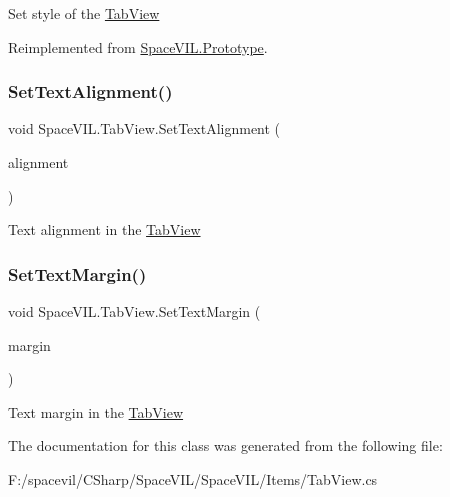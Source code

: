 Set style of the \mbox{\hyperlink{class_space_v_i_l_1_1_tab_view}{Tab\+View}} 



Reimplemented from \mbox{\hyperlink{class_space_v_i_l_1_1_prototype_ae96644a6ace490afb376fb542161e541}{Space\+V\+I\+L.\+Prototype}}.

\mbox{\label{class_space_v_i_l_1_1_tab_view_abdd2253b42ef61e32efb3115c679bbc5}} 
\subsubsection{\texorpdfstring{Set\+Text\+Alignment()}{SetTextAlignment()}}
{\footnotesize\ttfamily void Space\+V\+I\+L.\+Tab\+View.\+Set\+Text\+Alignment (\begin{DoxyParamCaption}\item[{Item\+Alignment}]{alignment }\end{DoxyParamCaption})}



Text alignment in the \mbox{\hyperlink{class_space_v_i_l_1_1_tab_view}{Tab\+View}} 

\mbox{\label{class_space_v_i_l_1_1_tab_view_af857743fb5c8b39d4090b5ae49f7abd5}} 
\subsubsection{\texorpdfstring{Set\+Text\+Margin()}{SetTextMargin()}}
{\footnotesize\ttfamily void Space\+V\+I\+L.\+Tab\+View.\+Set\+Text\+Margin (\begin{DoxyParamCaption}\item[{\mbox{\hyperlink{struct_space_v_i_l_1_1_decorations_1_1_indents}{Indents}}}]{margin }\end{DoxyParamCaption})}



Text margin in the \mbox{\hyperlink{class_space_v_i_l_1_1_tab_view}{Tab\+View}} 



The documentation for this class was generated from the following file\+:\begin{DoxyCompactItemize}
\item 
F\+:/spacevil/\+C\+Sharp/\+Space\+V\+I\+L/\+Space\+V\+I\+L/\+Items/Tab\+View.\+cs\end{DoxyCompactItemize}
